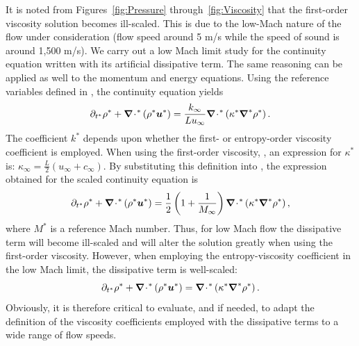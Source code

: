 It is noted from Figures~\ref{fig:Pressure} through~\ref{fig:Viscosity} that the first-order viscosity solution becomes ill-scaled. This is due to the low-Mach nature of the flow under consideration (flow speed around 5 m/s while the speed of sound is around 1,500 m/s). We carry out a low Mach limit study for the continuity equation written with its artificial dissipative term. The same reasoning can be applied as well to the momentum and energy equations. Using the reference variables defined in , the continuity equation yields
\begin{equation}
\label{eq:cont_proof}
\partial_{t^*} \rho^* + \boldsymbol{\nabla}\! \cdot \!^* \left( \rho^* \boldsymbol u^* \right) =  \frac{k_\infty}{L u_\infty}  \boldsymbol{\nabla}\! \cdot \!^*  \left( \kappa^*  \boldsymbol{\nabla}^* \rho^* \right).
\end{equation}
The coefficient $k^*$ depends upon whether the first- or entropy-order viscosity coefficient is employed. When using the first-order viscosity, , an expression for $\kappa^*$ is: $\kappa_\infty = \frac{L}{2}\left( u_\infty + c_\infty \right)$. By substituting this definition into , the expression obtained for the scaled continuity equation is
\begin{equation}
\label{eq:cont_proof2}
\partial_{t^*} \rho^* + \boldsymbol{\nabla}\! \cdot \!^* \left( \rho^* \boldsymbol u^* \right) = \frac{1}{2}\left( 1 + \frac{1}{M_\infty} \right) \boldsymbol{\nabla}\! \cdot \!^* \left(\kappa^*\boldsymbol{\nabla}^* \rho^* \right),
\end{equation}
where $M^*$ is a reference Mach number. Thus, for low Mach flow the dissipative term will become ill-scaled and will alter the solution greatly
when using the first-order viscosity. However, when employing the entropy-viscosity coefficient  in the low Mach limit, the dissipative term is well-scaled:
\begin{equation}
\label{eq:cont_proof3}
\partial_{t^*} \rho^* + \boldsymbol{\nabla}\! \cdot \!^* \left( \rho^* \boldsymbol u^* \right) =  \boldsymbol{\nabla}\! \cdot \!^*  \left(\kappa^* \boldsymbol{\nabla}^*  \rho^* \right).
\end{equation}
Obviously, it is therefore critical to evaluate, and if needed, to adapt the definition of the viscosity coefficients employed with the dissipative terms to a wide range of flow speeds.

